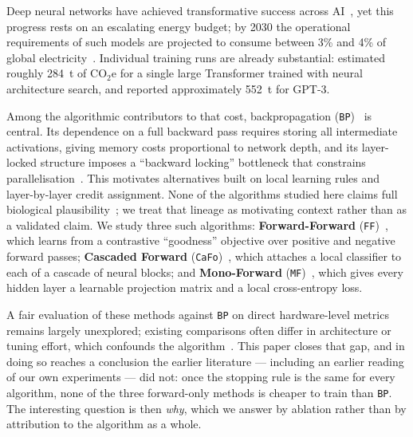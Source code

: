 \documentclass{llncs}
\newcommand{\FF}{\texttt{FF}}
\newcommand{\MF}{\texttt{MF}}
\newcommand{\BP}{\texttt{BP}}
\newcommand{\CaFo}{\texttt{CaFo}}
\begin{document}
Deep neural networks have achieved transformative success across
AI~\cite{krizhevsky2012imagenet}, yet this
progress rests on an escalating energy budget; by 2030 the operational
requirements of such models are projected to consume between 3\% and 4\% of
global electricity~\cite{wef2025paradox}. Individual training runs are already
substantial: \cite{strubell2019energy} estimated roughly
\SI{284}{\tonne} of CO$_2$e for a single large Transformer trained with
neural architecture search, and \cite{patterson2021carbon} reported
approximately \SI{552}{\tonne} for GPT-3.

Among the algorithmic contributors to that cost,
backpropagation (\BP{})~\cite{rumelhart1986learning} is central. Its
dependence on a full backward pass requires storing all intermediate
activations, giving memory costs proportional to network depth, and its
layer-locked structure imposes a ``backward locking'' bottleneck that
constrains parallelisation~\cite{jaderberg2017decoupled}. This motivates
alternatives built on local learning rules and layer-by-layer credit
assignment. None of the algorithms studied here claims full biological
plausibility~\cite{lillicrap2020backpropagation}; we treat that lineage as
motivating context rather than as a validated claim. We study three such
algorithms: \textbf{Forward-Forward}
(\FF{})~\cite{hinton2022forward}, which learns from a contrastive
``goodness'' objective over positive and negative forward passes;
\textbf{Cascaded Forward} (\CaFo{})~\cite{zhao2023cafo}, which attaches a
local classifier to each of a cascade of neural blocks; and
\textbf{Mono-Forward} (\MF{})~\cite{gong2025mono}, which gives every hidden
layer a learnable projection matrix and a local cross-entropy loss.

A fair evaluation of these methods against \BP{} on direct hardware-level
metrics remains largely unexplored; existing comparisons often differ in
architecture or tuning effort, which confounds the
algorithm~\cite{desislavov2024energy}. This paper closes that gap, and in
doing so reaches a conclusion the earlier literature --- including an
earlier reading of our own experiments --- did not: once the stopping rule
is the same for every algorithm, none of the three forward-only methods is
cheaper to train than \BP{}. The interesting question is then \emph{why},
which we answer by ablation rather than by attribution to the algorithm as
a whole.
\end{document}
